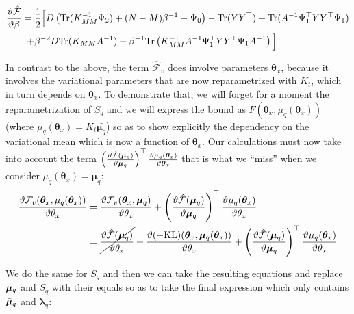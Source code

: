 \begin{align}
\frac{\vartheta \hat{\mathcal{F}}}{\vartheta \beta} ={}&
  \frac{1}{2} \Big[ 
      D \left( \text{Tr}(K_{MM}^{-1} \Psi_2) + (N-M)\beta^{-1} - \Psi_0 \right) - \text{Tr}(Y Y^{\top})
	  + \text{Tr}(A^{-1}\Psi_1^{\top} Y Y^{\top} \Psi_1) \nonumber \\
   +{}& \beta^{-2} D \text{Tr} ( K_{MM} A^{-1} ) + \beta^{-1} \text{Tr} \left( K_{MM}^{-1} A^{-1} \Psi_1^{\top} Y Y^{\top} \Psi_1 A^{-1} \right) \Big]
\label{derivb2}
\end{align}


In contrast to the above, the term $\hat{\mathcal{F}}_v$ does involve parameters $\boldsymbol \theta_x$, because it involves the variational parameters that are now reparametrized with $K_t$, which in turn depends on $\boldsymbol \theta_x$. 
To demonstrate that, we will forget for a moment the reparametrization of $S_q$ and we will express the bound as $F(\boldsymbol \theta_x, \mu_q (\boldsymbol \theta_x))$ (where $\mu_q (\boldsymbol \theta_x) = K_t \bar{\boldsymbol \mu_q}$) so as to show explicitly the dependency on the variational mean which is now a function of $\boldsymbol \theta_x$. Our calculations must now take into account the term
$
\left( \frac{\vartheta \hat{\mathcal{F}}(\boldsymbol \mu_q)}{\vartheta \boldsymbol \mu_q} \right)^{\top}
       \frac{\vartheta \mu_q (\boldsymbol \theta_x)}{\vartheta \boldsymbol \theta_x}
$
that is what we ``miss'' when we consider $\mu_q(\boldsymbol \theta_x) = \boldsymbol \mu_q$:
\begin{align}
\frac{\vartheta \mathcal{F}_v(\boldsymbol \theta_x, \mu_q(\boldsymbol \theta_x))}{\vartheta \theta_x} = {}&
	\frac{\vartheta \mathcal{F}_v(\boldsymbol \theta_x, \boldsymbol \mu_q)}{\vartheta \theta_x} 
  +  \left( \frac{\vartheta \hat{\mathcal{F}}(\boldsymbol \mu_q)}{\vartheta \boldsymbol \mu_q} \right)^{\top}
            \frac{\vartheta \mu_q(\boldsymbol \theta_x)}{\vartheta \theta_x} \nonumber \\
= {}&
 \cancel{
    \frac{\vartheta \hat{\mathcal{F}}(\boldsymbol \mu_q)}{\vartheta \theta_x}
  } +
  \frac{\vartheta (-\text{KL})(\boldsymbol \theta_x, \boldsymbol \mu_q(\boldsymbol \theta_x))}{\vartheta \theta_x}
+  \left( \frac{\vartheta \hat{\mathcal{F}}(\boldsymbol \mu_q)}{\vartheta \boldsymbol \mu_q} \right)^{\top}
            \frac{\vartheta \mu_q(\boldsymbol \theta_x)}{\vartheta \theta_x}
\label{meanReparamDerivFTheta}
\end{align}

We do the same for $S_q$ and then we can take the resulting equations and replace $\boldsymbol \mu_q$ and $S_q$ with their equals so as to take the final expression which only contains $\bar{\boldsymbol \mu}_q$ and $\boldsymbol \lambda_q$:

